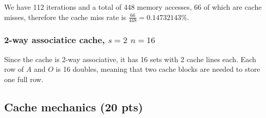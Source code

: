 We have 112 iterations and a total of 448 memory accesses, 66 of which are cache misses, therefore the cache miss rate is $\frac{66}{448} = 0.14732143\%$.\vspace*{-0.4cm}

\subsubsection{2-way associatice cache, $s=2$ $n=16$}
Since the cache is 2-way associative, it has 16 sets with 2 cache lines each. Each row of $A$ and $O$ is 16 doubles, meaning that two cache blocks are needed to store one full row.



\subsection{Cache mechanics (20 pts)}
